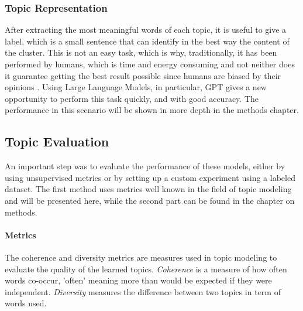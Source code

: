 \subsubsection{Topic Representation}
After extracting the most meaningful words of each topic, it is useful to give a label, which is a small sentence that can identify in the best way the content of the cluster. This is not an easy task, which is why, traditionally, it has been performed by humans, which is time and energy consuming and not neither does it guarantee getting the best result possible since humans are biased by their opinions  \cite{misra_seeing_2016} \cite{haliburton_investigating_2023}. Using Large Language Models, in particular, GPT gives a new opportunity to perform this task quickly, and with good accuracy. The performance in this scenario will be shown in more depth in the methods chapter.




\subsection{Topic Evaluation}
An important step was to evaluate the performance of these models, either by using unsupervised metrics or by setting up a custom experiment using a labeled dataset. The first method uses metrics well known in the field of topic modeling and will be presented here, while the second part can be found in the chapter on methods.

\paragraph{Metrics}

The coherence and diversity metrics are  measures used in topic modeling to evaluate the quality of the learned topics. 
\textit{Coherence} is a measure of how often words co-occur, 'often' meaning more than would be expected if they were independent. \textit{Diversity} measures the difference between two topics in term of words used.


